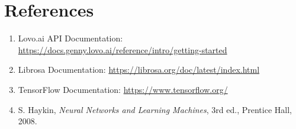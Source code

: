 \documentclass[12pt]{article}
\begin{document}
\section*{References}

\begin{enumerate}
    \item Lovo.ai API Documentation: \url{https://docs.genny.lovo.ai/reference/intro/getting-started}
    \item Librosa Documentation: \url{https://librosa.org/doc/latest/index.html}
    \item TensorFlow Documentation: \url{https://www.tensorflow.org/}
    \item S. Haykin, \textit{Neural Networks and Learning Machines}, 3rd ed., Prentice Hall, 2008.
\end{enumerate}
\end{document}
